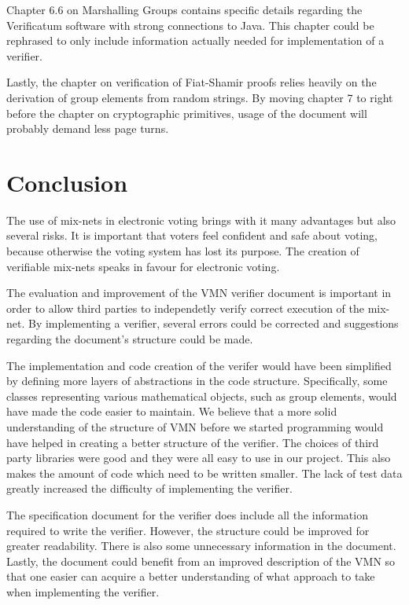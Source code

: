 Chapter 6.6 on Marshalling Groups contains specific details regarding
the Verificatum software with strong connections to Java. This chapter
could be rephrased to only include information actually needed for
implementation of a verifier.

Lastly, the chapter on verification of Fiat-Shamir proofs relies
heavily on the derivation of group elements from random strings. By
moving chapter 7 to right before the chapter on cryptographic
primitives, usage of the document will probably demand less page
turns.

\section{Conclusion}
The use of mix-nets in electronic voting brings with it many
advantages but also several risks. It is important that voters feel
confident and safe about voting, because otherwise the voting system
has lost its purpose. The creation of verifiable mix-nets speaks in
favour for electronic voting.

The evaluation and improvement of the VMN verifier document is
important in order to allow third parties to independetly verify
correct execution of the mix-net. By implementing a verifier, several
errors could be corrected and suggestions regarding the document's
structure could be made.

The implementation and code creation of the verifer would have been
simplified by defining more layers of abstractions in the code
structure. Specifically, some classes representing various
mathematical objects, such as group elements, would have made the code
easier to maintain. We believe that a more solid understanding of the
structure of VMN before we started programming would have helped in
creating a better structure of the verifier. The choices of third
party libraries were good and they were all easy to use in our
project. This also makes the amount of code which need to be written
smaller. The lack of test data greatly increased the difficulty of
implementing the verifier.

The specification document for the verifier does include all the
information required to write the verifier. However, the structure
could be improved for greater readability. There is also some
unnecessary information in the document. Lastly, the document could
benefit from an improved description of the VMN so that one easier can
acquire a better understanding of what approach to take when
implementing the verifier.
